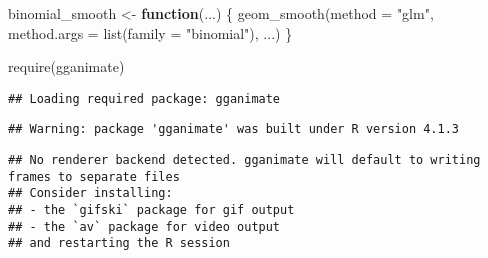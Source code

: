 \documentclass[
]{article}
\newenvironment{Shaded}{\begin{snugshade}}{\end{snugshade}}
\newcommand{\AttributeTok}[1]{\textcolor[rgb]{0.77,0.63,0.00}{#1}}
\newcommand{\ControlFlowTok}[1]{\textcolor[rgb]{0.13,0.29,0.53}{\textbf{#1}}}
\newcommand{\FunctionTok}[1]{\textcolor[rgb]{0.00,0.00,0.00}{#1}}
\newcommand{\NormalTok}[1]{#1}
\newcommand{\OtherTok}[1]{\textcolor[rgb]{0.56,0.35,0.01}{#1}}
\newcommand{\StringTok}[1]{\textcolor[rgb]{0.31,0.60,0.02}{#1}}
\begin{document}
\begin{Shaded}
\begin{Highlighting}[]
\NormalTok{binomial\_smooth }\OtherTok{\textless{}{-}} \ControlFlowTok{function}\NormalTok{(...) \{}
  \FunctionTok{geom\_smooth}\NormalTok{(}\AttributeTok{method =} \StringTok{"glm"}\NormalTok{, }\AttributeTok{method.args =} \FunctionTok{list}\NormalTok{(}\AttributeTok{family =} \StringTok{"binomial"}\NormalTok{), ...)}
\NormalTok{\}}

\FunctionTok{require}\NormalTok{(gganimate)}
\end{Highlighting}
\end{Shaded}

\begin{verbatim}
## Loading required package: gganimate
\end{verbatim}

\begin{verbatim}
## Warning: package 'gganimate' was built under R version 4.1.3
\end{verbatim}

\begin{verbatim}
## No renderer backend detected. gganimate will default to writing frames to separate files
## Consider installing:
## - the `gifski` package for gif output
## - the `av` package for video output
## and restarting the R session
\end{verbatim}
\end{document}
